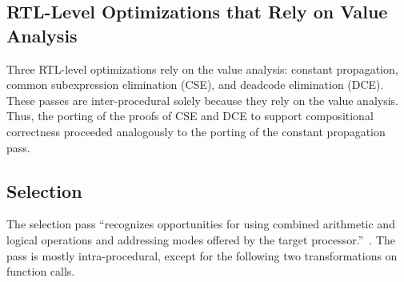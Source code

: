 



\subsection{RTL-Level Optimizations that Rely on Value Analysis}
Three RTL-level optimizations rely on the value analysis: constant
propagation, common subexpression elimination (CSE), and deadcode
elimination (DCE).  These passes are inter-procedural solely because
they rely on the value analysis.  Thus, the porting of the proofs of
CSE and DCE to support compositional correctness proceeded analogously
to the porting of the constant propagation pass.


\subsection{Selection}
The selection pass ``recognizes opportunities for using combined
arithmetic and logical operations and addressing modes offered by the
target processor.''~\cite{compcert-website}.  The pass is mostly
intra-procedural, except for the following two transformations on
function calls.


